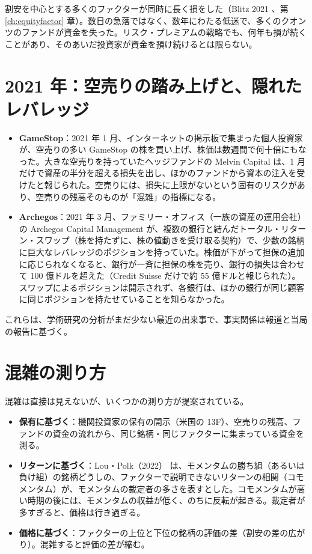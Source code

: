 割安を中心とする多くのファクターが同時に長く損をした（Blitz 2021 \cite{blitz2021}、第 \ref{ch:equityfactor} 章）。数日の急落ではなく、数年にわたる低迷で、多くのクオンツのファンドが資金を失った。リスク・プレミアムの戦略でも、何年も損が続くことがあり、そのあいだ投資家が資金を預け続けるとは限らない。

\section{2021 年：空売りの踏み上げと、隠れたレバレッジ}

\begin{itemize}
\item \textbf{GameStop}：2021 年 1 月、インターネットの掲示板で集まった個人投資家が、空売りの多い GameStop の株を買い上げ、株価は数週間で何十倍にもなった。大きな空売りを持っていたヘッジファンドの Melvin Capital は、1 月だけで資産の半分を超える損失を出し、ほかのファンドから資本の注入を受けたと報じられた。空売りには、損失に上限がないという固有のリスクがあり、空売りの残高そのものが「混雑」の指標になる。
\item \textbf{Archegos}：2021 年 3 月、ファミリー・オフィス（一族の資産の運用会社）の Archegos Capital Management が、複数の銀行と結んだトータル・リターン・スワップ（株を持たずに、株の値動きを受け取る契約）で、少数の銘柄に巨大なレバレッジのポジションを持っていた。株価が下がって担保の追加に応じられなくなると、銀行が一斉に担保の株を売り、銀行の損失は合わせて 100 億ドルを超えた（Credit Suisse だけで約 55 億ドルと報じられた）。スワップによるポジションは開示されず、各銀行は、ほかの銀行が同じ顧客に同じポジションを持たせていることを知らなかった。
\end{itemize}

これらは、学術研究の分析がまだ少ない最近の出来事で、事実関係は報道と当局の報告に基づく。

\section{混雑の測り方}

混雑は直接は見えないが、いくつかの測り方が提案されている。

\begin{itemize}
\item \textbf{保有に基づく}：機関投資家の保有の開示（米国の 13F）、空売りの残高、ファンドの資金の流れから、同じ銘柄・同じファクターに集まっている資金を測る。
\item \textbf{リターンに基づく}：Lou・Polk（2022）\cite{loupolk2022} は、モメンタムの勝ち組（あるいは負け組）の銘柄どうしの、ファクターで説明できないリターンの相関（コモメンタム）が、モメンタムの裁定者の多さを表すとした。コモメンタムが高い時期の後には、モメンタムの収益が低く、のちに反転が起きる。裁定者が多すぎると、価格は行き過ぎる。
\item \textbf{価格に基づく}：ファクターの上位と下位の銘柄の評価の差（割安の差の広がり）。混雑すると評価の差が縮む。
\end{itemize}

